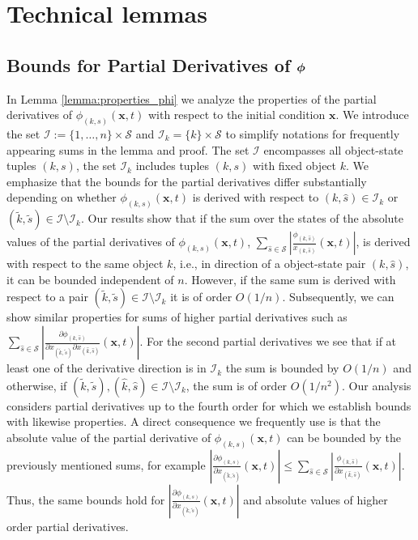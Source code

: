 \documentclass[acmsmall]{acmart}
\newcommand\bx{\mathbf{x}}
\newcommand\bphi{\text{\boldmath$\phi$}}
\newcommand\calI{\mathcal{I}}
\newcommand\calS{\mathcal{S}}
\newcommand\abs[1]{\left|#1\right|}         %
\begin{document}
\section{Technical lemmas}
\label{apx:proofs}


\subsection{Bounds for Partial Derivatives of $\bphi$}
\label{apx:proof_bounds_partial_derivatives}

In Lemma \ref{lemma:properties_phi} we analyze the properties of the partial derivatives of $\phi_{(k,s)}(\bx,t)$ with respect to the initial condition $\bx$. We introduce the set $\calI := \{1, \dots,n \} \times \calS$ and $\calI_{k} = \{k \} \times \calS$ to simplify notations for frequently appearing sums in the lemma and proof. The set $\calI$ encompasses all object-state tuples $(k,s)$, the set $\calI_{k}$ includes tuples $(k,s)$ with fixed object $k$. We emphasize that  the bounds for the partial derivatives differ substantially depending on whether $\phi_{(k,s)}(\bx,t)$ is derived with respect to $(k,\hat{s}) \in \calI_k$ or $(\tilde{k},\tilde{s}) \in \calI \setminus \calI_k$. Our results show that if the sum over the states of the absolute values of the partial derivatives of $\phi_{(k,s)}(\bx,t)$, $\sum_{\hat{s}\in\calS} \abs{\frac{\phi_{(k,\hat{s})} }{x_{(k,\hat{s})}} (\bx,t)}$, is derived with respect to the same object $k$, i.e., in direction of a object-state pair $(k,\hat{s})$, it can be bounded independent of $n$. However, if the same sum is derived with respect to a pair $(\tilde{k},\tilde{s}) \in \calI \setminus \calI_k$ it is of order $O(1/n)$. Subsequently, we can show similar properties for sums of higher partial derivatives such as $\sum_{\hat{s}\in\calS} \abs{\frac{\partial \phi_{(k,\hat{s})}}{\partial x_{(\tilde{k},\tilde{s})} \partial x_{(\hat{k},\hat{s})} }(\bx,t)}$. For the second partial derivatives we see that if at least one of the derivative direction is in $\calI_k$ the sum is bounded by $O(1/n)$ and otherwise, if $(\tilde{k},\tilde{s}),(\hat{k},\hat{s}) \in \calI \setminus \calI_k$, the sum is of order $O(1/n^2)$. Our analysis considers partial derivatives up to the fourth order for which we establish bounds with likewise properties. A direct consequence we frequently use is that the absolute value of the partial derivative of $\phi_{(k,s)}(\bx,t)$ can be bounded by the previously mentioned sums, for example $\abs{\frac{\partial \phi_{(k,s)}}{\partial x_{(\tilde{k},\tilde{s})}}(\bx,t)} \leq \sum_{\hat{s}\in\calS} \abs{\frac{\phi_{(k,\hat{s})} }{\partial x_{(\hat{k},\hat{s})}} (\bx,t)}$. Thus, the same bounds hold for $\abs{\frac{\partial \phi_{(k,s)}}{\partial x_{(\tilde{k},\tilde{s})}}(\bx,t)}$ and absolute values of higher order partial derivatives.
\end{document}
